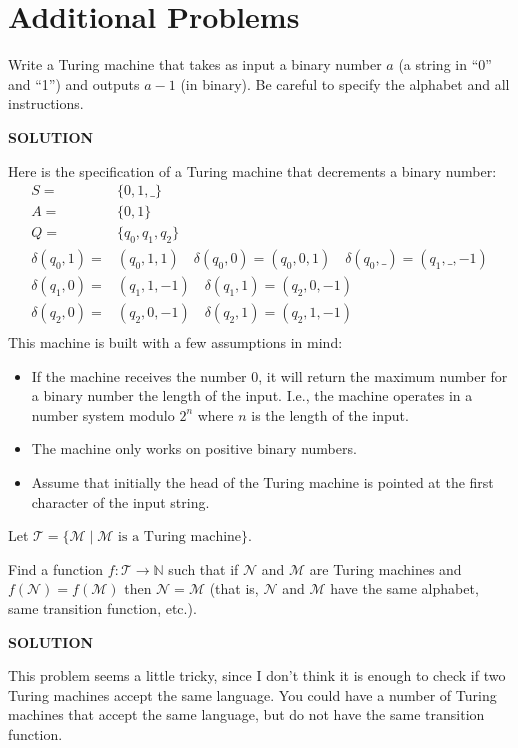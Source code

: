 \documentclass{exam} %
\newcommand{\NN}{\mathbb{N}}
\newcommand{\cl}[1]{\mathcal{#1}}  %
\theoremstyle{plain}
\theoremstyle{definition}
\theoremstyle{remark}
\newcommand{\ds}[1]{ \displaystyle{#1} }
\numberwithin{equation}{section}  %
\newcommand{\sol}{\begin{center}\textbf{SOLUTION}\end{center}}
\begin{document}
\section {Additional Problems}
\begin{questions}
\question Write a Turing machine that takes as input a binary number $a$ (a
string in ``0'' and ``1'') and outputs $a-1$ (in binary). Be careful to
specify the alphabet and all instructions.
\sol
Here is the specification of a Turing machine that decrements a binary number:
  \begin{align*}
    S =& \{0, 1, \_\}\\ 
    A =& \{0, 1\} \\ 
    Q =& \{q_0, q_1, q_2\} \\
    \delta(q_0, 1) =& (q_0, 1, 1) \quad \delta(q_0, 0) = (q_0, 0, 1) \quad \delta(q_0,\_) = (q_1, \_, -1) \\
    \delta(q_1,0)  =& (q_1, 1, -1) \quad \delta(q_1,1) = (q_2, 0, -1) \\
    \delta(q_2,0)  =& (q_2, 0, -1) \quad \delta(q_2,1) = (q_2, 1, -1) \\
  \end{align*}
This machine is built with a few assumptions in mind:
  \begin{itemize}
    \item If the machine receives the number 0, it will return the maximum number
      for a binary number the length of the input. I.e., the machine operates in
      a number system modulo $2^n$ where $n$ is the length of the input.
    \item The machine only works on positive binary numbers.
    \item Assume that initially the head of the Turing machine is pointed at the 
      first character of the input string.
  \end{itemize}
\question Let $\ds{ \cl{T} = \Big\{ \cl{M} \mid \cl{M} \text{ is a Turing
machine} \Big\} }$.

Find a function $f: \cl{T} \to \NN$ such that if $\cl{N}$ and $\cl{M}$ are
Turing machines and $f(\cl{N}) = f(\cl{M})$ then $\cl{N} = \cl{M}$ (that is,
$\cl{N}$ and $\cl{M}$ have the same alphabet, same transition function,
etc.).
\sol
This problem seems a little tricky, since I don't think it is enough to check if 
two Turing machines accept the same language. You could have a number of Turing 
machines that accept the same language, but do not have the same transition 
function.\\


\end{questions}
\end{document}
